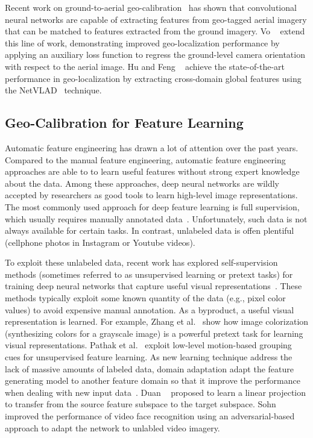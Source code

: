 Recent work on ground-to-aerial
geo-calibration~\cite{lin2013cross,lin2015learning,workman2015geocnn,workman2015wide}
has shown that convolutional neural networks are capable of extracting
features from geo-tagged aerial imagery that can be matched to
features extracted from the ground imagery.  Vo
\etal~\cite{vo2016localizing} extend this line of work, demonstrating
improved geo-localization performance by applying an auxiliary loss
function to regress the ground-level camera orientation with respect
to the aerial image. Hu and Feng \etal~\cite{mh2018cvm} achieve the
state-of-the-art performance in geo-localization by extracting
cross-domain global features using the
NetVLAD~\cite{arandjelovic2016netvlad} technique.


\subsection{Geo-Calibration for Feature Learning}

Automatic feature engineering has drawn a lot of attention over the
past years. Compared to the manual feature engineering,
automatic feature engineering approaches are able to to learn useful
features without strong expert knowledge about the data. Among these
approaches, deep neural networks are wildly accepted by researchers as
good tools to learn high-level image representations.  The most
commonly used approach for deep feature learning is full supervision,
which usually requires manually annotated
data~\cite{yosinski2014transferable,zhou2016learning,wen2016discriminative}.
Unfortunately, such data is not always available for certain tasks.
In contrast, unlabeled data is offen plentiful (\ie cellphone photos
in Instagram or Youtube videos).

To exploit these unlabeled data, recent work has explored
self-supervision methods (sometimes referred to as unsupervised learning or
pretext tasks) for training deep neural networks that capture useful
visual representations~\cite{doersch2015unsupervised,pathak2016context}. 
These methods typically
exploit some known quantity of the data (e.g., pixel color values) to
avoid expensive manual annotation. As a byproduct, a useful visual
representation is learned.
For example, Zhang et al.~\cite{zhang2016colorful} show how image
colorization (synthesizing colors for a grayscale image) is a powerful
pretext task for learning visual representations. Pathak et
al.~\cite{pathak2017learning} exploit low-level motion-based grouping
cues for unsupervised feature learning.  
%
As new learning technique address the lack of massive amounts of
labeled data, domain adaptation adapt the feature generating model to
another feature domain so that it improve the performance when dealing
with new input
data~\cite{fernando2013unsupervised,fernando2015joint,saenko2010adapting,wang2016actions,tinghui2016flow}.
Duan \etal~\cite{duan2012learning} proposed to learn a linear
projection to transfer from the source feature subspace to the target
subspace. Sohn \etal~\cite{sohn2017unsupervised} improved the
performance of video face recognition using an adversarial-based
approach to adapt the network to unlabled video imagery.

